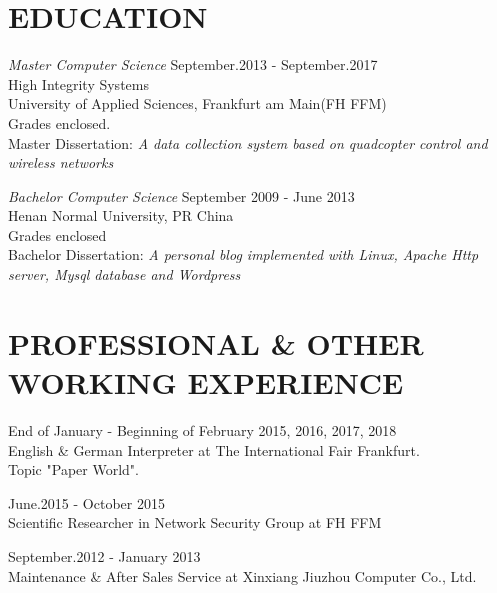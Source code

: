 \documentclass[margin, 10pt]{res} %
\begin{document}
\begin{resume}
\section{EDUCATION}

{\sl Master Computer Science} \hfill  September.2013 - September.2017\\
High Integrity Systems \\ University of Applied Sciences, Frankfurt am Main(FH FFM)\\
Grades enclosed.\\
Master Dissertation: \textit{A data collection system based on quadcopter control and wireless networks}

{\sl Bachelor Computer Science} \hfill September 2009 - June 2013 \\
Henan Normal University, PR China\\
Grades enclosed\\
Bachelor Dissertation: \textit{A personal blog implemented with Linux, Apache Http server, Mysql database and Wordpress}


\section{PROFESSIONAL \& OTHER WORKING EXPERIENCE} 

End of January - Beginning of February 2015, 2016, 2017, 2018\\
English \& German Interpreter at The International Fair Frankfurt.\\
Topic "Paper World". 

June.2015 - October 2015\\
Scientific Researcher in Network Security Group at FH FFM 

September.2012 - January 2013\\
Maintenance \& After Sales Service at Xinxiang Jiuzhou Computer Co., Ltd.



\end{resume}
\end{document}
